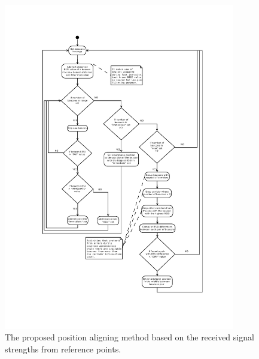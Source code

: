 \documentclass[../main.tex]{subfiles}
\begin{document}
\begin{figure}[!htbp]
\includegraphics[width=0.9\textwidth, trim={2cm 2cm 2cm 2cm},clip]{pictures/architecture_beacons_processing.pdf}
\centering
\caption{The proposed position aligning method based on the received signal strengths from reference points.}
\label{fig:architecture_beacons_processing}
\end{figure}
\end{document}
